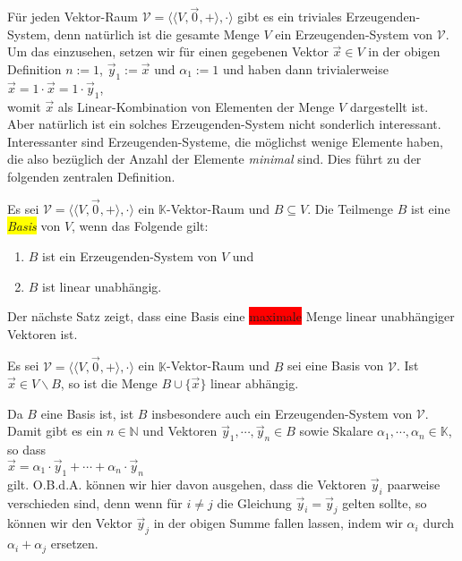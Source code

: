 F\"{u}r jeden Vektor-Raum $\mathcal{V} = \bigl\langle \langle V, \vec{0}, + \rangle, \cdot \bigr\rangle$ 
gibt es ein triviales Erzeugenden-System, denn nat\"{u}rlich ist die gesamte 
Menge $V$ ein Erzeugenden-System von $\mathcal{V}$.  Um das einzusehen, setzen wir f\"{u}r einen gegebenen Vektor
$\vec{x} \in V$ in der obigen Definition $n:=1$, $\vec{y}_1 := \vec{x}$ und $\alpha_1 := 1$
und haben dann trivialerweise
\\[0.2cm]
\hspace*{1.3cm}
$\vec{x} = 1 \cdot \vec{x} = 1 \cdot \vec{y}_1$,
\\[0.2cm]
womit $\vec{x}$ als Linear-Kombination von Elementen der Menge $V$ dargestellt ist.  Aber
nat\"{u}rlich ist ein solches Erzeugenden-System nicht sonderlich interessant.  Interessanter sind
Erzeugenden-Systeme, die m\"{o}glichst wenige Elemente haben, die also bez\"{u}glich der Anzahl
der Elemente \emph{minimal} sind.  Dies f\"{u}hrt zu der folgenden zentralen Definition.

\begin{Definition}[Basis]
  Es sei $\mathcal{V} = \bigl\langle \langle V, \vec{0}, + \rangle, \cdot \bigr\rangle$ ein $\mathbb{K}$-Vektor-Raum 
  und $B \subseteq V$.  Die Teilmenge $B$ ist eine
  \colorbox{yellow}{\emph{Basis}} von $V$, wenn das Folgende gilt:
  \begin{enumerate}
  \item $B$ ist ein Erzeugenden-System von $V$ und
  \item $B$ ist linear unabh\"{a}ngig.  \eoxs
  \end{enumerate}
\end{Definition}

\noindent
Der n\"{a}chste Satz zeigt, dass eine Basis eine \colorbox{red}{maximale} Menge linear unabh\"{a}ngiger Vektoren ist.

\begin{Satz}
  Es sei $\mathcal{V} = \bigl\langle \langle V, \vec{0}, + \rangle, \cdot \bigr\rangle$ 
  ein $\mathbb{K}$-Vektor-Raum und $B$ sei eine Basis von $\mathcal{V}$.  Ist $\vec{x} \in V \backslash B$,
  so ist die Menge $B \cup \{ \vec{x} \}$ linear abh\"{a}ngig.
\end{Satz}

\proof
Da $B$ eine Basis ist, ist $B$ insbesondere auch ein Erzeugenden-System von $\mathcal{V}$.  Damit gibt es ein
$n \in \mathbb{N}$ und Vektoren $\vec{y}_1,\cdots,\vec{y}_n \in B$ sowie Skalare $\alpha_1, \cdots,\alpha_n \in \mathbb{K}$,
so dass
\\[0.2cm]
\hspace*{1.3cm}
$\vec{x} = \alpha_1 \cdot \vec{y}_1 + \cdots + \alpha_n \cdot \vec{y}_n$
\\[0.2cm]
gilt.  O.B.d.A. k\"{o}nnen wir hier davon ausgehen, dass die Vektoren $\vec{y}_i$ paarweise
verschieden sind, denn wenn f\"{u}r $i\not= j$ die Gleichung $\vec{y}_i = \vec{y}_j$
gelten sollte, so k\"{o}nnen wir den Vektor $\vec{y}_j$ in der obigen Summe fallen lassen,
indem wir $\alpha_i$ durch $\alpha_i + \alpha_j$ ersetzen.

